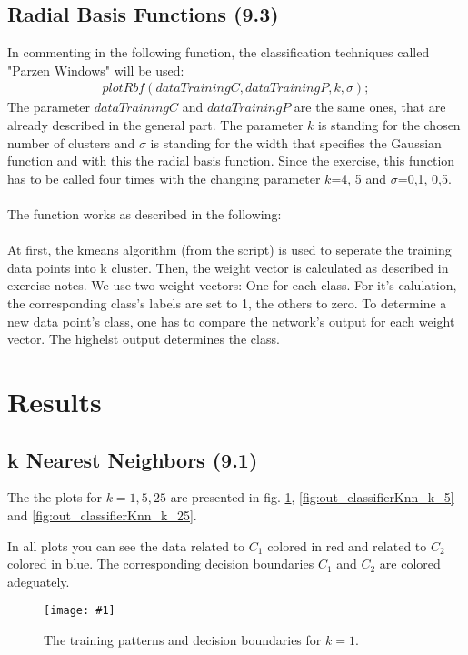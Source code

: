 \documentclass[a4paper,headings=small]{scrartcl}
\newcommand{\image}[3]{
\begin{figure}[htbp]
\centering
\texttt{[image: \#1]}
\caption{#3}
\label{fig:#1}
\end{figure}
}
\begin{document}
\subsection{Radial Basis Functions (9.3)}
In commenting in the following function, the classification techniques called "Parzen Windows" will be used:\\
\begin{align}
plotRbf(dataTrainingC, dataTrainingP, k, \sigma);
\end{align}
The parameter $dataTrainingC$ and $dataTrainingP$ are the same ones, that are already described in the general part. The parameter $k$ is standing for the chosen number of clusters and $\sigma$ is standing for the width that specifies the Gaussian function and with this the radial basis function.
Since the exercise, this function has to be called four times with the changing parameter $k$=4, 5 and $\sigma$=0,1, 0,5.\\
\\
The function works as described in the following:\\
\\
At first, the kmeans algorithm (from the script) is used to seperate the training data points into k cluster. Then, the weight vector is calculated as described in exercise notes. We use two weight vectors: One for each class. For it's calulation, the corresponding class's labels are set to 1, the others to zero. To determine a new data point's class, one has to compare the network's output for each weight vector. The highelst output determines the class.


\section{Results}

\newcommand{\classifierPlotWidth}[0]{0.85}

\subsection{k Nearest Neighbors (9.1)}
The the plots for $k = 1, 5, 25$ are presented in fig.
\ref{fig:out_classifierKnn_k_1},
\ref{fig:out_classifierKnn_k_5} and
\ref{fig:out_classifierKnn_k_25}.

In all plots you can see the data related to $C_1$ colored in red and related to $C_2$ colored in blue.
The corresponding decision boundaries $C_1$ and $C_2$ are colored adeguately.

\image{out_classifierKnn_k_1}{\classifierPlotWidth}%
	{The training patterns and decision boundaries for $k = 1$.}
\end{document}
